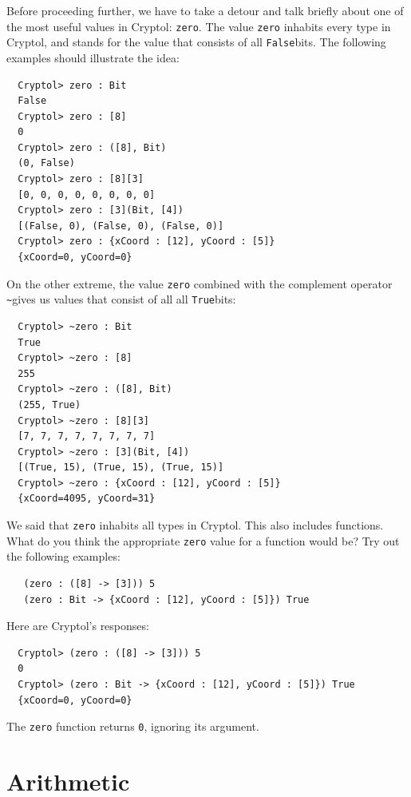 Before proceeding further, we have to take a detour and talk briefly
about one of the most useful values in Cryptol: {\tt zero}.\indZero
The value {\tt zero} inhabits every type in Cryptol, and stands for
the value that consists of all {\tt False}\indFalse bits. The
following examples should illustrate the idea:
\begin{Verbatim}
  Cryptol> zero : Bit
  False
  Cryptol> zero : [8]
  0
  Cryptol> zero : ([8], Bit)
  (0, False)
  Cryptol> zero : [8][3]
  [0, 0, 0, 0, 0, 0, 0, 0]
  Cryptol> zero : [3](Bit, [4])
  [(False, 0), (False, 0), (False, 0)]
  Cryptol> zero : {xCoord : [12], yCoord : [5]}
  {xCoord=0, yCoord=0}
\end{Verbatim}

\noindent On the other extreme, the value {\tt zero} combined with the
complement operator {\tt \Verb|~|}\indComplement gives us values that
consist of all all {\tt True}\indTrue bits:
\begin{Verbatim}
  Cryptol> ~zero : Bit
  True
  Cryptol> ~zero : [8]
  255
  Cryptol> ~zero : ([8], Bit)
  (255, True)
  Cryptol> ~zero : [8][3]
  [7, 7, 7, 7, 7, 7, 7, 7]
  Cryptol> ~zero : [3](Bit, [4])
  [(True, 15), (True, 15), (True, 15)]
  Cryptol> ~zero : {xCoord : [12], yCoord : [5]}
  {xCoord=4095, yCoord=31}
\end{Verbatim}

\begin{Exercise}\label{ex:zero:0}
  We said that {\tt zero} inhabits all types in Cryptol. This also
  includes functions. What do you think the appropriate {\tt zero}
  value for a function would be?  Try out the following examples:
\begin{Verbatim}
   (zero : ([8] -> [3])) 5
   (zero : Bit -> {xCoord : [12], yCoord : [5]}) True
\end{Verbatim}
\end{Exercise}
\begin{Answer}
Here are Cryptol's responses:\indZero
\begin{Verbatim}
  Cryptol> (zero : ([8] -> [3])) 5
  0
  Cryptol> (zero : Bit -> {xCoord : [12], yCoord : [5]}) True
  {xCoord=0, yCoord=0}
\end{Verbatim}
The {\tt zero} function returns {\tt 0}, ignoring its argument.
\end{Answer}

\section{Arithmetic}
\label{sec:arithmetic}

